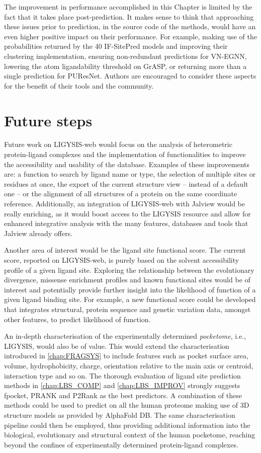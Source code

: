 The improvement in performance accomplished in this Chapter is limited by the fact that it takes place post-prediction. It makes sense to think that approaching these issues prior to prediction, in the source code of the methods, would have an even higher positive impact on their performance. For example, making use of the probabilities returned by the 40 IF-SitePred models and improving their clustering implementation, ensuring non-redundant predictions for VN-EGNN, lowering the atom ligandability threshold on GrASP, or returning more than a single prediction for PUResNet. Authors are encouraged to consider these aspects for the benefit of their tools and the community.

\section{Future steps}

Future work on LIGYSIS-web would focus on the analysis of heterometric protein-ligand complexes and the implementation of functionalities to improve the accessibility and usability of the database. Examples of these improvements are: a function to search by ligand name or type, the selection of multiple sites or residues at once, the export of the current structure view -- instead of a default one -- or the alignment of all structures of a protein on the same coordinate reference. Additionally, an integration of LIGYSIS-web with Jalview would be really enriching, as it would boost access to the LIGYSIS resource and allow for enhanced integrative analysis with the many features, databases and tools that Jalview already offers.

Another area of interest would be the ligand site functional score. The current score, reported on LIGYSIS-web, is purely based on the solvent accessibility profile of a given ligand site. Exploring the relationship between the evolutionary divergence, missense enrichment profiles and known functional sites would be of interest and potentially provide further insight into the likelihood of function of a given ligand binding site. For example, a new functional score could be developed that integrates structural, protein sequence and genetic variation data, amongst other features, to predict likelihood of function.

An in-depth characterisation of the experimentally determined \textit{pocketome}, i.e., LIGYSIS, would also be of value. This would extend the characterisation introduced in \autoref{chap:FRAGSYS} to include features such as pocket surface area, volume, hydrophobicity, charge, orientation relative to the main axis or centroid, interaction type and so on. The thorough evaluation of ligand site prediction methods in \autoref{chap:LBS_COMP} and \autoref{chap:LBS_IMPROV} strongly suggests fpocket, PRANK and P2Rank as the best predictors. A combination of these methods could be used to predict on all the human proteome making use of 3D structure models as provided by AlphaFold DB. The same characterisation pipeline could then be employed, thus providing additional information into the biological, evolutionary and structural context of the human pocketome, reaching beyond the confines of experimentally determined protein-ligand complexes.

